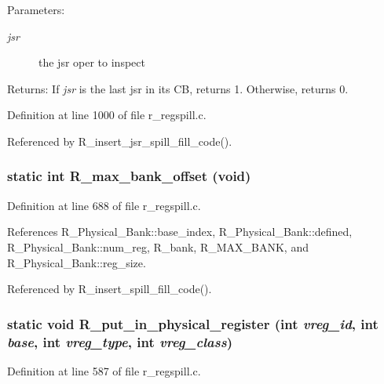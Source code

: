 \begin{Desc}
\item[Parameters:]
\begin{description}
\item[{\em jsr}]the jsr oper to inspect\end{description}
\end{Desc}
\begin{Desc}
\item[Returns:]If {\em jsr\/} is the last jsr in its CB, returns 1. Otherwise, returns 0. \end{Desc}


Definition at line 1000 of file r\_\-regspill.c.

Referenced by R\_\-insert\_\-jsr\_\-spill\_\-fill\_\-code().
\subsubsection{\setlength{\rightskip}{0pt plus 5cm}static int R\_\-max\_\-bank\_\-offset (void)\hspace{0.3cm}{\tt  [static]}}\label{r__regspill_8c_a9445d3553d88ccb8288bebc089b91d1}




Definition at line 688 of file r\_\-regspill.c.

References R\_\-Physical\_\-Bank::base\_\-index, R\_\-Physical\_\-Bank::defined, R\_\-Physical\_\-Bank::num\_\-reg, R\_\-bank, R\_\-MAX\_\-BANK, and R\_\-Physical\_\-Bank::reg\_\-size.

Referenced by R\_\-insert\_\-spill\_\-fill\_\-code().
\subsubsection{\setlength{\rightskip}{0pt plus 5cm}static void R\_\-put\_\-in\_\-physical\_\-register (int {\em vreg\_\-id}, int {\em base}, int {\em vreg\_\-type}, int {\em vreg\_\-class})\hspace{0.3cm}{\tt  [static]}}\label{r__regspill_8c_4b219c2fd7c58744317fcae1b6446822}




Definition at line 587 of file r\_\-regspill.c.

